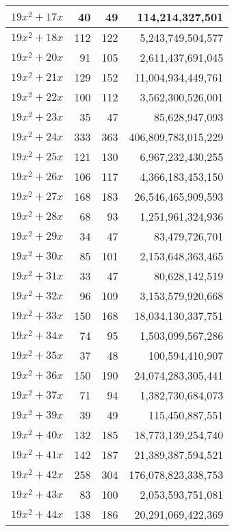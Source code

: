 \documentclass[a4paper]{amsproc}
\theoremstyle{plain}
\begin{document}
\begin{longtable}{ | l | r | r | r | }
$19x^2 + 17x$ & 40 & 49 & 114{,}214{,}327{,}501 \\ \hline
$19x^2 + 18x$ & 112 & 122 & 5{,}243{,}749{,}504{,}577 \\ \hline
$19x^2 + 20x$ & 91 & 105 & 2{,}611{,}437{,}691{,}045 \\ \hline
$19x^2 + 21x$ & 129 & 152 & 11{,}004{,}934{,}449{,}761 \\ \hline
$19x^2 + 22x$ & 100 & 112 & 3{,}562{,}300{,}526{,}001 \\ \hline
$19x^2 + 23x$ & 35 & 47 & 85{,}628{,}947{,}093 \\ \hline
$19x^2 + 24x$ & 333 & 363 & 406{,}809{,}783{,}015{,}229 \\ \hline
$19x^2 + 25x$ & 121 & 130 & 6{,}967{,}232{,}430{,}255 \\ \hline
$19x^2 + 26x$ & 106 & 117 & 4{,}366{,}183{,}453{,}150 \\ \hline
$19x^2 + 27x$ & 168 & 183 & 26{,}546{,}465{,}909{,}593 \\ \hline
$19x^2 + 28x$ & 68 & 93 & 1{,}251{,}961{,}324{,}936 \\ \hline
$19x^2 + 29x$ & 34 & 47 & 83{,}479{,}726{,}701 \\ \hline
$19x^2 + 30x$ & 85 & 101 & 2{,}153{,}648{,}363{,}465 \\ \hline
$19x^2 + 31x$ & 33 & 47 & 80{,}628{,}142{,}519 \\ \hline
$19x^2 + 32x$ & 96 & 109 & 3{,}153{,}579{,}920{,}668 \\ \hline
$19x^2 + 33x$ & 150 & 168 & 18{,}034{,}130{,}337{,}751 \\ \hline
$19x^2 + 34x$ & 74 & 95 & 1{,}503{,}099{,}567{,}286 \\ \hline
$19x^2 + 35x$ & 37 & 48 & 100{,}594{,}410{,}907 \\ \hline
$19x^2 + 36x$ & 150 & 190 & 24{,}074{,}283{,}305{,}441 \\ \hline
$19x^2 + 37x$ & 71 & 94 & 1{,}382{,}730{,}684{,}073 \\ \hline
$19x^2 + 39x$ & 39 & 49 & 115{,}450{,}887{,}551 \\ \hline
$19x^2 + 40x$ & 132 & 185 & 18{,}773{,}139{,}254{,}740 \\ \hline
$19x^2 + 41x$ & 142 & 187 & 21{,}389{,}387{,}594{,}521 \\ \hline
$19x^2 + 42x$ & 258 & 304 & 176{,}078{,}823{,}338{,}753 \\ \hline
$19x^2 + 43x$ & 83 & 100 & 2{,}053{,}593{,}751{,}081 \\ \hline
$19x^2 + 44x$ & 138 & 186 & 20{,}291{,}069{,}422{,}369 \\ \hline

\end{longtable}
\end{document}
